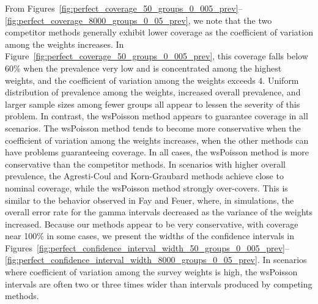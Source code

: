 \documentclass[AMA,STIX1COL]{WileyNJD-v2}
\begin{document}
From Figures~\ref{fig:perfect_coverage_50_groups_0_005_prev}--\ref{fig:perfect_coverage_8000_groups_0_05_prev}, we note that the two competitor methods generally exhibit lower coverage as the coefficient of variation among the weights increases.
In Figure~\ref{fig:perfect_coverage_50_groups_0_005_prev}, this coverage falls below 60\% when the prevalence very low and is concentrated among the highest weights, and the coefficient of variation among the weights exceeds 4.
Uniform distribution of prevalence among the weights, increased overall prevalence, and larger sample sizes among fewer groups all appear to lessen the severity of this problem.
In contrast, the wsPoisson method appears to guarantee coverage in all scenarios.
The wsPoisson method tends to become more conservative when the coefficient of variation among the weights increases, when the other methods can have problems guaranteeing coverage. 
In all cases, the wsPoisson method is more conservative than the competitor methods.
In scenarios with higher overall prevalence, the Agresti-Coul and Korn-Graubard methods achieve close to nominal coverage, while the wsPoisson method strongly over-covers.
This is similar to the behavior observed in Fay and Feuer\cite{FayF:1997}, where, in simulations, the overall error rate for the gamma intervals decreased as the variance of the weights increased.
Because our methods appear to be very conservative, with coverage near 100\% in some cases, we present the widths of the confidence intervals in Figures~\ref{fig:perfect_confidence_interval_width_50_groups_0_005_prev}--\ref{fig:perfect_confidence_interval_width_8000_groups_0_05_prev}.
In scenarios where coefficient of variation among the survey weights is high, the wsPoisson intervals are often two or three times wider than intervals produced by competing methods.
\end{document}
